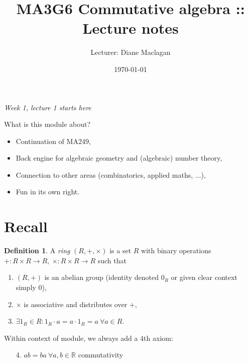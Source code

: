 \documentclass[a4paper]{article}
\title{MA3G6 Commutative algebra :: Lecture notes}
\author{Lecturer: Diane Maclagan}
\date{\today}
\theoremstyle{definition}
\newtheorem{defn}{Definition}[subsection]
\begin{document}
\maketitle
\thispagestyle{empty}

\tableofcontents
\thispagestyle{empty}
\newpage
\setcounter{page}{1}

\begin{flushright}
\textit{Week 1, lecture 1 starts here}
\end{flushright}

What is this module about?
\begin{itemize}
\item Continuation of MA249,
\item Back engine for algebraic geometry and (algebraic) number theory,
\item Connection to other areas (combinatorics, applied maths, ...),
\item Fun in its own right.
\end{itemize}

\section*{Recall}
\begin{defn}
A \textit{ring} $(R,+,\times)$ is a set $R$ with binary operations $+:R\times R\rightarrow R,\ \times:R\times R\rightarrow R$ such that
\begin{enumerate}
\item $(R,+)$ is an abelian group (identity denoted $0_R$ or given clear context simply 0),
\item $\times$ is associative and distributes over $+$,
\item $\exists 1_R\in R:1_R\cdot a = a\cdot 1_R=a\ \forall a \in R$.
\end{enumerate}
\end{defn}
Within context of module, we always add a 4th axiom:
\begin{enumerate}
\item[4.] $ab=ba \ \forall a,b\in \mathbb R$ \qquad commutativity
\end{enumerate}
\end{document}
